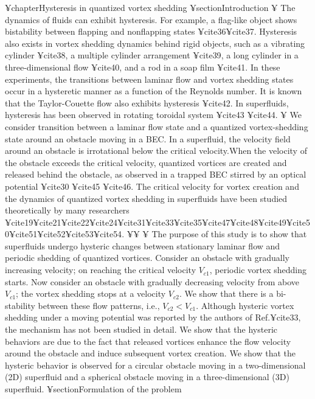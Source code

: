 {{{{¥chapter{Hysteresis in quantized vortex shedding}
¥section{Introduction}
¥ The dynamics of fluids can exhibit hysteresis. For example,
a flag-like object shows bistability between flapping and 
nonflapping states ¥cite{36}¥cite{37}. Hysteresis also exists
in vortex shedding dynamics behind rigid objects, such
as a vibrating cylinder ¥cite{38}, a multiple cylinder arrangement ¥cite{39},
a long cylinder in a three-dimensional flow ¥cite{40},
and a rod in a soap film ¥cite{41}. In these experiments, the
transitions between laminar flow and vortex shedding states occur
in a hysteretic manner as a function of the Reynolds number.
It is known that the Taylor-Couette flow also exhibits hysteresis ¥cite{42}.
In superfluids, hysteresis has been observed in rotating toroidal system ¥cite{43} ¥cite{44}.
¥ We consider transition between a laminar
flow state and a quantized vortex-shedding state around
an obstacle moving in a BEC. In a superfluid,
the velocity field around an obstacle is irrotational
below the critical velocity.When the velocity of the obstacle
exceeds the critical velocity, quantized vortices are
created and released behind the obstacle, as observed in a trapped BEC
stirred by an optical potential ¥cite{30} ¥cite{45} ¥cite{46}. The critical velocity
for vortex creation and the dynamics of quantized vortex
shedding in superfluids have been studied theoretically by many researchers ¥cite{19}¥cite{21}¥cite{22}¥cite{24}¥cite{31}¥cite{33}¥cite{35}¥cite{47}¥cite{48}¥cite{49}¥cite{50}¥cite{51}¥cite{52}¥cite{53}¥cite{54}.
¥¥
¥ The purpose of this study is to show that superfluids
undergo hysteric changes between stationary laminar flow
and periodic shedding of quantized vortices. Consider an
obstacle with gradually increasing velocity; on reaching the
critical velocity $V_{c1}$, periodic vortex shedding starts. Now
consider an obstacle with gradually decreasing velocity from
above $V_{c1}$; the vortex shedding stops at a velocity $V_{c2}$. We
show that there is a bi-stability between these flow patterns,
i.e., $V_{c2} < V_{c1}$. Although hysteric vortex shedding under a
moving potential was reported by the authors of Ref.¥cite{33},
the mechanism has not been studied in detail. 
We show that the hysteric behaviors are due to the
fact that released vortices enhance the flow velocity around
the obstacle and induce subsequent vortex creation. We show
that the hysteric behavior is observed for a circular obstacle
moving in a two-dimensional (2D) superfluid and a spherical
obstacle moving in a three-dimensional (3D) superfluid.
¥section{Formulation of the problem}
}}}}
